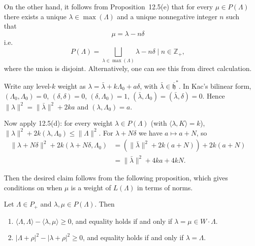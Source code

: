 \documentclass[12pt]{article}
\begin{document}
On the other hand, it follows from Proposition~12.5(e) that for every $\mu \in P(\Lambda)$ there exists a unique $\lambda \in \operatorname{max}(\Lambda)$ and a unique nonnegative integer $n$ such that
\[\mu = \lambda - n\delta\]
i.e.
\begin{equation}
P(\Lambda) = \bigsqcup_{\lambda \in \operatorname{max}(\Lambda)} {\lambda - n\delta \mid n \in \mathbb{Z}_+},
\label{eq:12.6.1}
\end{equation}
where the union is disjoint. Alternatively, one can see this from direct calculation. 

Write any level-$k$ weight as $\lambda=\bar\lambda+k\Lambda_0+a\delta$, with $\bar\lambda\in\overline{\mathfrak h}^*$. In Kac's bilinear form,
$(\Lambda_0,\Lambda_0)=0$, $(\delta,\delta)=0$, $(\delta,\Lambda_0)=1$,
$(\bar\lambda,\Lambda_0)=(\bar\lambda,\delta)=0$.
Hence $\|\lambda\|^2=\|\bar\lambda\|^2+2ka$ and $(\lambda,\Lambda_0)=a$.

Now apply 12.5(d): for every weight $\lambda\in P(\Lambda)$ (with $\langle\lambda,K\rangle=k$),
$\|\lambda\|^2+2k(\lambda,\Lambda_0)\le\|\Lambda\|^2$.
For $\lambda+N\delta$ we have $a\mapsto a+N$, so
\begin{align*}
\|\lambda+N\delta\|^2+2k(\lambda+N\delta,\Lambda_0)
&= (\|\bar\lambda\|^2+2k(a+N)) + 2k(a+N) \\
&= \|\bar\lambda\|^2+4k a + 4kN.
\end{align*}

Then the desired claim follows from the following proposition, which gives conditions on when $\mu$ is a weight of $L(\Lambda)$ in terms of norms.

\begin{proposition}[11.4]
Let $\Lambda \in P_+$ and $\lambda, \mu \in P(\Lambda)$. Then
\begin{enumerate}[label=\alph*)]
\item $\langle \Lambda, \Lambda \rangle - \langle \lambda, \mu \rangle \ge 0$, and equality holds if and only if $\lambda = \mu \in W \cdot \Lambda$.
\item $|\Lambda + \rho|^2 - |\lambda + \rho|^2 \ge 0$, and equality holds if and only if $\lambda = \Lambda$.
\end{enumerate}
\end{proposition}
\end{document}
